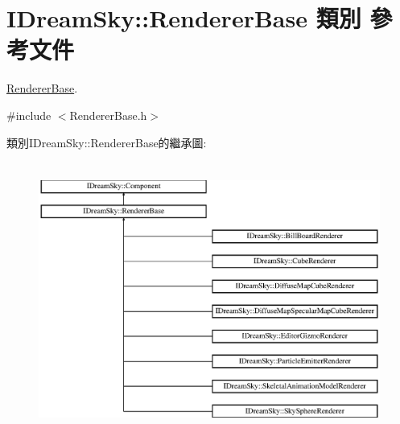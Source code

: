 \hypertarget{class_i_dream_sky_1_1_renderer_base}{}\section{I\+Dream\+Sky\+:\+:Renderer\+Base 類別 參考文件}
\label{class_i_dream_sky_1_1_renderer_base}


\hyperlink{class_i_dream_sky_1_1_renderer_base}{Renderer\+Base}.  




{\ttfamily \#include $<$Renderer\+Base.\+h$>$}

類別\+I\+Dream\+Sky\+:\+:Renderer\+Base的繼承圖\+:\begin{figure}[H]
\begin{center}
\leavevmode
\includegraphics[height=9.003216cm]{class_i_dream_sky_1_1_renderer_base}
\end{center}
\end{figure}

